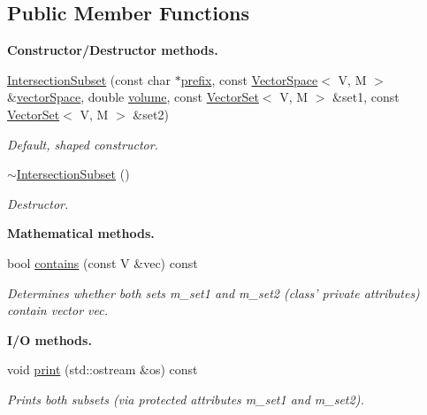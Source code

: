 \subsection*{Public Member Functions}
\begin{Indent}{\bf Constructor/\-Destructor methods.}\par
\begin{DoxyCompactItemize}
\item 
\hyperlink{class_q_u_e_s_o_1_1_intersection_subset_a4a0924e5e8d6089f04a3b4012cf1cd51}{Intersection\-Subset} (const char $\ast$\hyperlink{class_q_u_e_s_o_1_1_vector_set_aedcd4b0f502af4c6e6df863c13cddfec}{prefix}, const \hyperlink{class_q_u_e_s_o_1_1_vector_space}{Vector\-Space}$<$ V, M $>$ \&\hyperlink{class_q_u_e_s_o_1_1_vector_subset_afc859b5206bc056c66893c854c191959}{vector\-Space}, double \hyperlink{class_q_u_e_s_o_1_1_vector_set_a3266f16e2672f5f3c929f22df085e545}{volume}, const \hyperlink{class_q_u_e_s_o_1_1_vector_set}{Vector\-Set}$<$ V, M $>$ \&set1, const \hyperlink{class_q_u_e_s_o_1_1_vector_set}{Vector\-Set}$<$ V, M $>$ \&set2)
\begin{DoxyCompactList}\small\item\em Default, shaped constructor. \end{DoxyCompactList}\item 
\hyperlink{class_q_u_e_s_o_1_1_intersection_subset_a7c087a2532980355186f25f7b3c12594}{$\sim$\-Intersection\-Subset} ()
\begin{DoxyCompactList}\small\item\em Destructor. \end{DoxyCompactList}\end{DoxyCompactItemize}
\end{Indent}
\begin{Indent}{\bf Mathematical methods.}\par
\begin{DoxyCompactItemize}
\item 
bool \hyperlink{class_q_u_e_s_o_1_1_intersection_subset_a6484888d9232f6ba88865b7a8f45d323}{contains} (const V \&vec) const 
\begin{DoxyCompactList}\small\item\em Determines whether both sets m\-\_\-set1 and m\-\_\-set2 (class' private attributes) contain vector {\ttfamily vec}. \end{DoxyCompactList}\end{DoxyCompactItemize}
\end{Indent}
\begin{Indent}{\bf I/\-O methods.}\par
\begin{DoxyCompactItemize}
\item 
void \hyperlink{class_q_u_e_s_o_1_1_intersection_subset_ae82d30c62afbd72bc09435888d0c6cbd}{print} (std\-::ostream \&os) const 
\begin{DoxyCompactList}\small\item\em Prints both subsets (via protected attributes m\-\_\-set1 and m\-\_\-set2). \end{DoxyCompactList}\end{DoxyCompactItemize}
\end{Indent}
